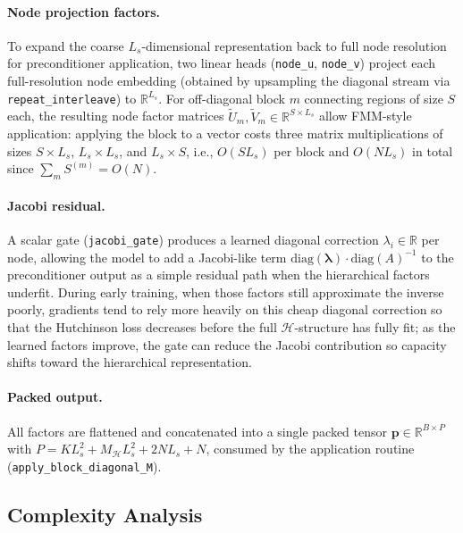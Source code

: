 \documentclass[acmtog,anonymous,review]{acmart}
\begin{document}
\paragraph{Node projection factors.}
To expand the coarse $L_s$-dimensional representation back to full node resolution for
preconditioner application, two linear heads (\texttt{node\_u}, \texttt{node\_v}) project each
full-resolution node embedding (obtained by upsampling the diagonal stream via
\texttt{repeat\_interleave}) to $\mathbb{R}^{L_s}$.  For off-diagonal block $m$ connecting
regions of size $S$ each, the resulting node factor matrices $\tilde{U}_m, \tilde{V}_m \in
\mathbb{R}^{S \times L_s}$ allow FMM-style application: applying the block to a vector costs
three matrix multiplications of sizes $S \times L_s$, $L_s \times L_s$, and $L_s \times S$,
i.e., $O(S L_s)$ per block and $O(N L_s)$ in total since $\sum_m S^{(m)} = O(N)$.

\paragraph{Jacobi residual.}
A scalar gate (\texttt{jacobi\_gate}) produces a learned diagonal correction $\lambda_i \in
\mathbb{R}$ per node, allowing the model to add a Jacobi-like term
$\mathrm{diag}(\boldsymbol{\lambda}) \cdot \mathrm{diag}(A)^{-1}$ to the preconditioner output
as a simple residual path when the hierarchical factors underfit.
During early training, when those factors still approximate the inverse poorly, gradients tend to
rely more heavily on this cheap diagonal correction so that the Hutchinson loss decreases before
the full $\mathcal{H}$-structure has fully fit; as the learned factors improve, the gate can
reduce the Jacobi contribution so capacity shifts toward the hierarchical representation.

\paragraph{Packed output.}
All factors are flattened and concatenated into a single packed tensor $\mathbf{p} \in \mathbb{R}^{B
\times P}$ with $P = K L_s^2 + M_\mathcal{H} L_s^2 + 2N L_s + N$, consumed by the application
routine (\texttt{apply\_block\_diagonal\_M}).

\subsection{Complexity Analysis}
\label{sec:method:complexity}
\end{document}
